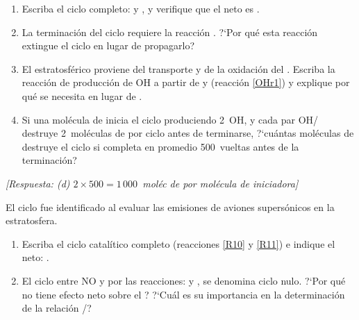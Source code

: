 \begin{bloque_ejercicios}
\begin{ejercicios}
\begin{enumerate}[label=\alph*)]
    \item Escriba el ciclo completo:
           y
          ,
          y verifique que el neto es .

    \item La terminaci\'on del ciclo requiere la reacci\'on
          .
          ?`Por qu\'e esta reacci\'on extingue el ciclo
          en lugar de propagarlo?

    \item El  estratosf\'erico proviene del
          transporte y de la oxidaci\'on del .
          Escriba la reacci\'on de producci\'on de OH
          a partir de  y 
          (reacci\'on \ref{OHr1}) y explique por qu\'e
          se necesita  en lugar de .

    \item Si una mol\'ecula de  inicia el ciclo
          produciendo 2~OH, y cada par OH/ destruye
          2~mol\'eculas de  por ciclo antes de
          terminarse, ?`cu\'antas mol\'eculas de 
          destruye el ciclo si completa en promedio
          500~vueltas antes de la terminaci\'on?
\end{enumerate}

\textit{[Respuesta:
(d) $2\times500 = 1\,000$~mol\'ec de  por
    mol\'ecula de  iniciadora]}

\item El ciclo  fue identificado al evaluar
las emisiones de aviones supers\'onicos en la estratosfera.

\begin{enumerate}[label=\alph*)]
    \item Escriba el ciclo catal\'itico  completo
          (reacciones \ref{R10} y \ref{R11}) e indique
          el neto: .

    \item El ciclo entre NO y  por las reacciones:
           y
          ,
          se denomina ciclo nulo.
          ?`Por qu\'e no tiene efecto neto sobre el ?
          ?`Cu\'al es su importancia en la determinaci\'on
          de la relaci\'on /?


\end{enumerate}
\end{ejercicios}
\end{bloque_ejercicios}
